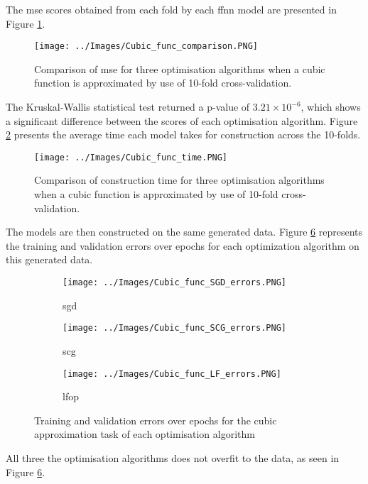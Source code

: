 \documentclass[10pt, conference]{IEEEtran}
\begin{document}
The \acrshort{mse} scores obtained from each fold by each \acrshort{ffnn}
model are presented in Figure \ref{fig:Cubic_function_comparison}.
\begin{figure}[H]
    \centerline{\texttt{[image: ../Images/Cubic\_func\_comparison.PNG]}}
    \caption{Comparison of \acrshort{mse} for three optimisation algorithms when a cubic function is approximated by use of 10-fold cross-validation.}
    \label{fig:Cubic_function_comparison}
\end{figure}
The Kruskal-Wallis statistical test returned a p-value of $3.21\times10^{-6}$, which shows a significant
difference between the scores of each optimisation algorithm. Figure \ref{fig:Cubic_function_time}
presents the average time each model takes for construction across the 10-folds.
\begin{figure}[H]
    \centerline{\texttt{[image: ../Images/Cubic\_func\_time.PNG]}}
    \caption{Comparison of construction time for three optimisation algorithms when a cubic function is approximated by use of 10-fold cross-validation.}
    \label{fig:Cubic_function_time}
\end{figure}

The models are then constructed on the same generated data. Figure \ref{fig:Cubic_errors} represents
the training and validation errors over epochs for each optimization algorithm on this generated data.
\begin{figure}[H]
    \centering
    \begin{subfigure}[b]{0.23\textwidth}
        \centering
        \texttt{[image: ../Images/Cubic\_func\_SGD\_errors.PNG]}
        \caption{\acrshort{sgd}}
        \label{fig:Cubic_func_SGD_errors}
    \end{subfigure}
    \hfill
    \begin{subfigure}[b]{0.23\textwidth}
        \centering
        \texttt{[image: ../Images/Cubic\_func\_SCG\_errors.PNG]}
        \caption{\acrshort{scg}}
        \label{fig:Cubic_func_SCG_errors}
    \end{subfigure}
    \begin{subfigure}[b]{0.23\textwidth}
        \centering
        \texttt{[image: ../Images/Cubic\_func\_LF\_errors.PNG]}
        \caption{\acrshort{lfop}}
        \label{fig:Cubic_func_LF_errors}
    \end{subfigure}
    \caption{Training and validation errors over epochs for the cubic approximation task of each optimisation algorithm}
    \label{fig:Cubic_errors}
\end{figure}
All three the optimisation algorithms does not overfit to the data, as seen in Figure \ref{fig:Cubic_errors}.
\end{document}
